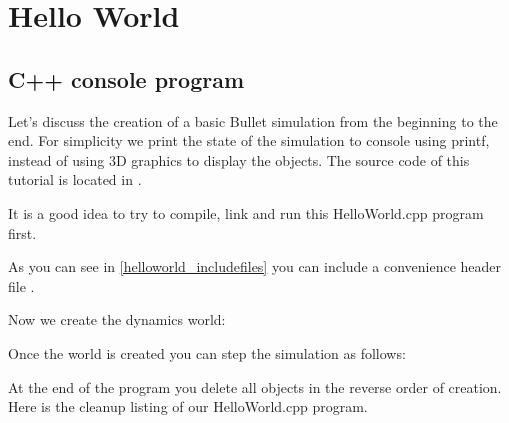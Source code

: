 \chapter{Hello World}
\section{C++ console program}
Let's discuss the creation of a basic Bullet simulation from the beginning to the end. For simplicity we print the state of the simulation to console using printf, instead of using 3D graphics to display the objects. The source code of this tutorial is located in .

It is a good idea to try to compile, link and run this HelloWorld.cpp program first.

As you can see in \ref{helloworld_includefiles} you can include a convenience header file .


Now we create the dynamics world:

Once the world is created you can step the simulation as follows:

At the end of the program you delete all objects in the reverse order of creation. Here is the cleanup listing of our HelloWorld.cpp program.


